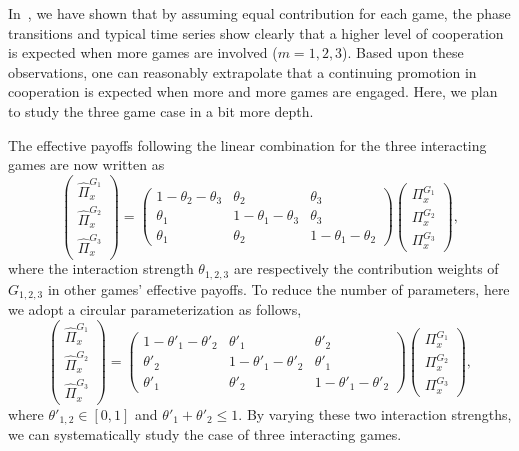 \documentclass[showpacs,superscriptaddress,reprint,nofootinbib,amsmath,amssymb,aps,pre]{revtex4-1}
\begin{document}
In~\cite{CSL}, we have shown that by assuming equal contribution for each game, the phase transitions and typical time series show clearly that a higher level of cooperation is expected when more games are involved ($m=1,2,3$). Based upon these observations, one can reasonably extrapolate that a continuing promotion in cooperation is expected when more and more games are engaged. Here, we plan to study the three game case in a bit more depth.
 
The effective payoffs following the linear combination for the three interacting games are now written as 
\begin{equation}
\begin{pmatrix}
\widehat\Pi^{G_1}_{x} \\ \widehat\Pi^{G_2}_{x} \\ \widehat\Pi^{G_3}_{x} 
\end{pmatrix}
\!=\!
\begin{pmatrix}
1\!-\!\theta_2\!-\!\theta_3 & \theta_2 & \theta_3 \\
\theta_1 & 1\!-\!\theta_1\!-\!\theta_3 & \theta_3 \\
\theta_1 & \theta_2 & 1\!-\!\theta_1\!-\!\theta_2  
\end{pmatrix}
\begin{pmatrix}
\Pi^{G_1}_{x} \\ \Pi^{G_2}_{x} \\ \Pi^{G_3}_{x} 
\end{pmatrix},
\label{eq:3game}
\end{equation}
where the interaction strength $\theta_{1,2,3}$ are respectively the contribution weights of $G_{1,2,3}$ in other games' effective payoffs. To reduce the number of parameters, here we adopt a circular parameterization as follows,
\begin{equation}
\begin{pmatrix}
\widehat\Pi^{G_1}_{x} \\ \widehat\Pi^{G_2}_{x} \\ \widehat\Pi^{G_3}_{x} 
\end{pmatrix}
\!=\!
\begin{pmatrix}
1\!-\!\theta'_1\!-\!\theta'_2 & \theta'_1 & \theta'_2 \\
\theta'_2 & 1\!-\!\theta'_1\!-\!\theta'_2 & \theta'_1 \\
\theta'_1 & \theta'_2 & 1\!-\!\theta'_1\!-\!\theta'_2  
\end{pmatrix}
\begin{pmatrix}
\Pi^{G_1}_{x} \\ \Pi^{G_2}_{x} \\ \Pi^{G_3}_{x} 
\end{pmatrix},
\label{eq:3game_reduced}
\end{equation}
where $\theta'_{1,2}\in [0,1]$ and $\theta'_1+\theta'_2\le1$. By varying these two interaction strengths, we can systematically study the case of three interacting games.
 
\end{document}
